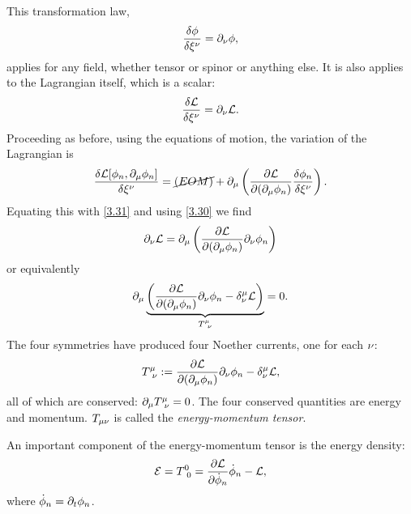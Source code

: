 This transformation law,
\begin{equation}\label{3.30}
  \frac{\delta\phi }{\delta\xi^\nu }=\partial_\nu \phi ,
\end{equation}
applies for any field, whether tensor or spinor or anything else. It is also applies to the Lagrangian itself, which is a scalar:
\begin{equation}\label{3.31}
  \frac{\delta\mathcal{L} }{\delta\xi^\nu }=\partial_\nu \mathcal{L}  .
\end{equation}
Proceeding as before, using the equations of motion, the variation of the Lagrangian is
\begin{equation}
  \frac{\delta \mathcal{L} [\phi_n ,\partial_\mu \phi_n]}{\delta\xi^\nu }=\cancel{(EOM)}+\partial_\mu \left(\pdv{\mathcal{L}}{(\partial_\mu\phi_n )}\frac{\delta\phi_n}{\delta \xi^\nu }\right).
\end{equation}
Equating this with \eqref{3.31} and using \eqref{3.30} we find
\begin{equation}
  \partial_\nu \mathcal{L}=\partial_\mu \left(\pdv{\mathcal{L}}{(\partial_\mu\phi_n )}\partial_\nu \phi_n \right)
\end{equation}
or equivalently
\begin{equation}
	\partial_\mu \underbrace{\left(\pdv{\mathcal{L}}{(\partial_\mu\phi_n )}\partial_\nu \phi_n -\delta^\mu _\nu \mathcal{L}\right)}_{T^\mu _{~\nu }}=0.
\end{equation}
The four symmetries have produced four Noether currents, one for each $\nu $:
\begin{equation}
  T^\mu _{~\nu }:=\pdv{\mathcal{L}}{(\partial_\mu\phi_n )}\partial_\nu \phi_n -\delta^\mu _\nu \mathcal{L},
\end{equation}
all of which are conserved: $\partial_\mu T^\mu _{~\nu }=0$. The four conserved quantities are energy and momentum. $T_{\mu\nu }$ is called the \textit{energy-momentum tensor}.

An important component of the energy-momentum tensor is the energy density:
\begin{equation}
  \mathcal{E}=T^{0}_{~0}=\pdv{\mathcal{L}}{\dot{\phi}_n}\dot{\phi }_n-\mathcal{L},
\end{equation}
where $\dot{\phi }_n=\partial_t\phi_n$.




















































